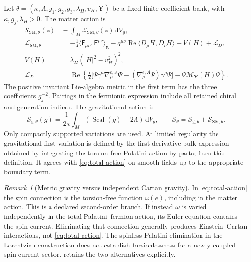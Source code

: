 \documentclass[11pt]{article}
\numberwithin{equation}{section}
\theoremstyle{definition}
\theoremstyle{remark}
\newtheorem{remark}[remark]{Remark}
\newcommand{\dd}{\mathrm d}
\newcommand{\ii}{\mathrm i}
\newcommand{\Rea}{\operatorname{Re}}
\newcommand{\Scal}{\operatorname{Scal}}
\newcommand{\abs}[1]{\lvert#1\rvert}
\newcommand{\ip}[2]{\langle#1,#2\rangle}
\newcommand{\Sact}{\mathscr S}
\newcommand{\Fcurv}{\mathsf F}
\newcommand{\bPsi}{\overline\Psi}
\newcommand{\dV}{\dd V}
\begin{document}
Let $\theta=(\kappa,\Lambda,g_1,g_2,g_3,\lambda_H,v_H,\boldsymbol Y)$ be a fixed finite coefficient bank, with $\kappa,g_j,\lambda_H>0$. The matter action is
\begin{align}
 \Sact_{\mathrm{SM},\theta}(z)
 &=\int_M\mathcal L_{\mathrm{SM},\theta}(z)\,\dV_g,
 \label{eq:SM-action}\\
 \mathcal L_{\mathrm{SM},\theta}
 &=-\tfrac14\ip{\Fcurv_{\mu\nu}}{\Fcurv^{\mu\nu}}_{\boldsymbol g}
   -g^{\mu\nu}\Rea\ip{D_\mu H}{D_\nu H}
   -V(H)+\mathcal L_D,\nonumber\\
 V(H)&=\lambda_H(\abs H^2-v_H^2)^2,\nonumber\\
 \mathcal L_D
 &=\Rea\left\{\tfrac{\ii}{2}
 \bigl[\bPsi\gamma^\mu\nabla^{e,A}_\mu\Psi
       -(\nabla^{e,A}_\mu\bPsi)\gamma^\mu\Psi\bigr]
       -\bPsi\mathscr M_{\boldsymbol Y}(H)\Psi\right\}.
 \label{eq:dirac-density}
\end{align}
The positive invariant Lie-algebra metric in the first term has the three coefficients $g_j^{-2}$. Pairings in the fermionic expression include all retained chiral and generation indices. The gravitational action is
\begin{equation}
 \Sact_{\mathrm g,\theta}(g)
 =\frac{1}{2\kappa}\int_M(\Scal(g)-2\Lambda)\,\dV_g,
 \qquad \Sact_\theta=\Sact_{\mathrm g,\theta}+\Sact_{\mathrm{SM},\theta}.
 \label{eq:total-action}
\end{equation}
Only compactly supported variations are used. At limited regularity the gravitational first variation is defined by the first-derivative bulk expression obtained by integrating the torsion-free Palatini action by parts;  fixes this definition. It agrees with \eqref{eq:total-action} on smooth fields up to the appropriate boundary term.

\begin{remark}[Metric gravity versus independent Cartan gravity]
\label{rem:torsion}
In \eqref{eq:total-action} the spin connection is the torsion-free function $\omega(e)$, including in the matter action. This is a declared second-order branch. If instead $\omega$ is varied independently in the total Palatini--fermion action, its Euler equation contains the spin current. Eliminating that connection generally produces Einstein--Cartan interactions, not \eqref{eq:total-action}. The spinless Palatini elimination in the Lorentzian construction \cite{PelissierRenewalSpacetime2026} does not establish torsionlessness for a newly coupled spin-current sector.  retains the two alternatives explicitly.
\end{remark}
\end{document}
